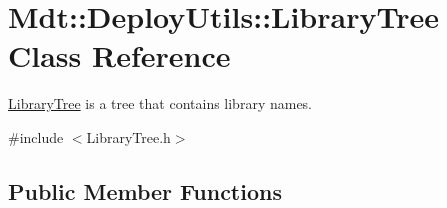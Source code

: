 \hypertarget{class_mdt_1_1_deploy_utils_1_1_library_tree}{}\section{Mdt\+:\+:Deploy\+Utils\+:\+:Library\+Tree Class Reference}
\label{class_mdt_1_1_deploy_utils_1_1_library_tree}


\hyperlink{class_mdt_1_1_deploy_utils_1_1_library_tree}{Library\+Tree} is a tree that contains library names.  




{\ttfamily \#include $<$Library\+Tree.\+h$>$}

\subsection*{Public Member Functions}
